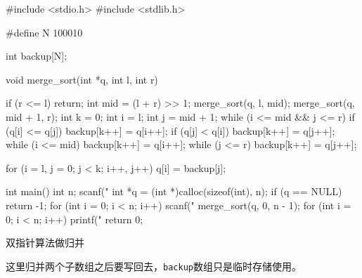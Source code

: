 \begin{mycpptwocol}
    #include <stdio.h>
    #include <stdlib.h>

    #define N 100010

    int backup[N];

    void merge_sort(int *q, int l, int r)
        {
        if (r <= l) {
            return;
        }
        int mid = (l + r) >> 1;
        merge_sort(q, l, mid);
        merge_sort(q, mid + 1, r);
        int k = 0;
        int i = l;
        int j = mid + 1;
        while (i <= mid && j <= r) {
            if (q[i] <= q[j]) {
                backup[k++] = q[i++];
            }
            if (q[j] < q[i]) {
                backup[k++] = q[j++];
            }
        }
        while (i <= mid) {
            backup[k++] = q[i++];
        }
        while (j <= r) {
            backup[k++] = q[j++];
        }

        for (i = l, j = 0; j < k; i++, j++) {
            q[i] = backup[j];
        }
    }

    int main()
        {
        int n;
        scanf("%
        int *q = (int *)calloc(sizeof(int), n);
        if (q == NULL) {
            return -1;
        }
        for (int i = 0; i < n; i++) {
            scanf("%
        }
        merge_sort(q, 0, n - 1);
        for (int i = 0; i < n; i++) {
            printf("%
        }
        return 0;
    }
\end{mycpptwocol}

双指针算法做归并

\begin{keypoint}
    这里归并两个子数组之后要写回去，\lstinline{backup}数组只是临时存储使用。
\end{keypoint}

